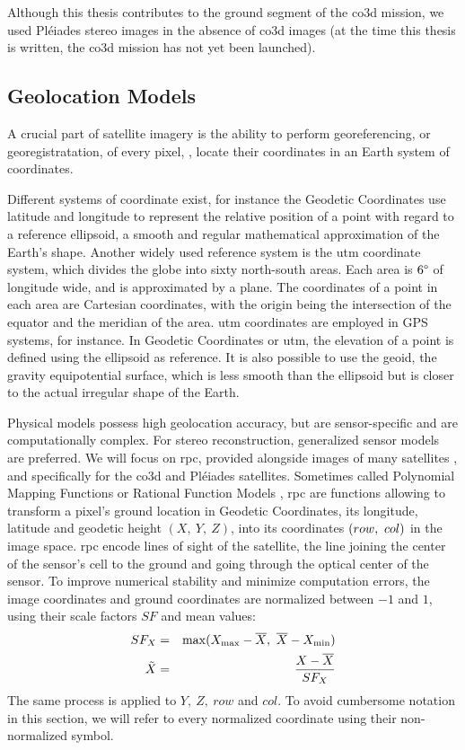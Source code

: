 Although this thesis contributes to the ground segment of the \acrshort{co3d} mission, we used Pléiades stereo images in the absence of \acrshort{co3d} images (at the time this thesis is written, the \acrshort{co3d} mission has not yet been launched).

\subsection{Geolocation Models}\label{sec:sensors_rpc}
A crucial part of satellite imagery is the ability to perform georeferencing, or georegistratation, of every pixel, \ie, locate their coordinates in an Earth system of coordinates.

Different systems of coordinate exist, for instance the Geodetic Coordinates use latitude and longitude to represent the relative position of a point with regard to a reference ellipsoid, \ie a smooth and regular mathematical approximation of the Earth's shape. Another widely used reference system is the \acrfull{utm} coordinate system, which divides the globe into sixty north-south areas. Each area is $6\degree$ of longitude wide, and is approximated by a plane. The coordinates of a point in each area are Cartesian coordinates, with the origin being the intersection of the equator and the meridian of the area. \acrshort{utm} coordinates are employed in GPS systems, for instance. In Geodetic Coordinates or \acrshort{utm}, the elevation of a point is defined using the ellipsoid as reference. It is also possible to use the geoid, \ie the gravity equipotential surface, which is less smooth than the ellipsoid but is closer to the actual irregular shape of the Earth.

Physical models possess high geolocation accuracy, but are sensor-specific and are computationally complex. For stereo reconstruction, generalized sensor models are preferred. We will focus on \acrfull{rpc}, provided alongside images of many satellites \cite{grodecki_ikonos_2001,devika_developement_2006}, and specifically for the \acrshort{co3d} and Pléiades satellites. Sometimes called Polynomial Mapping Functions \cite{baltsavias_metric_1992} or Rational Function Models \cite{tao_comprehensive_2001}, \acrshort{rpc} are functions allowing to transform a pixel's ground location in Geodetic Coordinates, \ie its longitude, latitude and geodetic height $(X,~Y,~Z)$, into its coordinates $(row, ~col)$ in the image space. \acrshort{rpc} encode lines of sight of the satellite, \ie the line joining the center of the sensor's cell to the ground and going through the optical center of the sensor. To improve numerical stability and minimize computation errors, the image coordinates and ground coordinates are normalized between $-1$ and $1$, using their scale factors $SF$ and mean values:
\begin{eqnarray*}
    SF_X &=& \max(X_\mathrm{max}-\overline{X},~\overline{X}-X_\mathrm{min})\\
    \Tilde{X}&=&\frac{X-\overline{X}}{SF_X}
\end{eqnarray*}
The same process is applied to $Y, ~Z,~row$ and $col$. To avoid cumbersome notation in this section, we will refer to every normalized coordinate using their non-normalized symbol.

